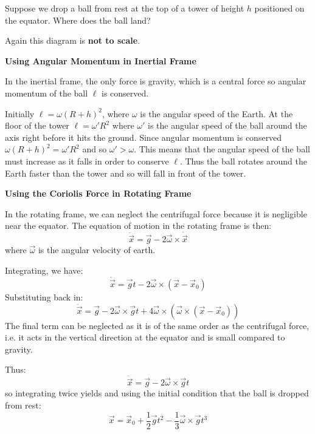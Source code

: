 \documentclass[../main.tex]{subfiles}
\begin{document}
\begin{example}
  Suppose we drop a ball from rest at the top of a tower of height $h$ positioned on the equator.
  Where does the ball land?
  \begin{center}
  \end{center}
  Again this diagram is \textbf{not to scale}.

  \textbf{Using Angular Momentum in Inertial Frame}\par
  In the inertial frame, the only force is gravity, which is a central force so angular momentum of the ball $\ell$ is conserved.

  Initially $\ell = \omega(R + h)^2$, where $\omega$ is the angular speed of the Earth.
  At the floor of the tower $\ell = \omega'R^2$ where $\omega'$ is the angular speed of the ball around the axis right before it hits the ground.
  Since angular momentum is conserved $\omega(R + h)^2 = \omega'R^2$ and so $\omega' > \omega$.
  This means that the angular speed of the ball must increase as it falls in order to conserve $\ell$.
  Thus the ball rotates around the Earth faster than the tower and so will fall in front of the tower.

  \textbf{Using the Coriolis Force in Rotating Frame}\par
  In the rotating frame, we can neglect the centrifugal force because it is negligible near the equator.
  The equation of motion in the rotating frame is then:
  \[
    \ddot{\vec{x}} = \vec{g} - 2 \vec{\omega} \times \dot{\vec{x}}
  \]
  where $\vec{\omega}$ is the angular velocity of earth.

  Integrating, we have:
  \[
    \dot{\vec{x}} = \vec{g} t - 2 \vec{\omega} \times (\vec{x} - \vec{x}_0)
  \]
  Substituting back in:
  \[
    \ddot{\vec{x}} = \vec{g} - 2 \vec{\omega} \times \vec{g} t + 4 \vec{\omega} \times (\vec{\omega} \times (\vec{x} - \vec{x}_0))
  \]
  The final term can be neglected as it is of the same order as the centrifugal force, i.e. it acts in the vertical direction at the equator and is small compared to gravity.

  Thus:
  \[
    \ddot{\vec{x}} = \vec{g} - 2 \vec{\omega} \times \vec{g} t
  \]
  so integrating twice yields and using the initial condition that the ball is dropped from rest:
  \[
    \vec{x} = \vec{x}_0 +  \frac{1}{2}\vec{g} t^2 - \frac{1}{3} \vec{\omega} \times \vec{g} t^3
  \]


\end{example}
\end{document}
